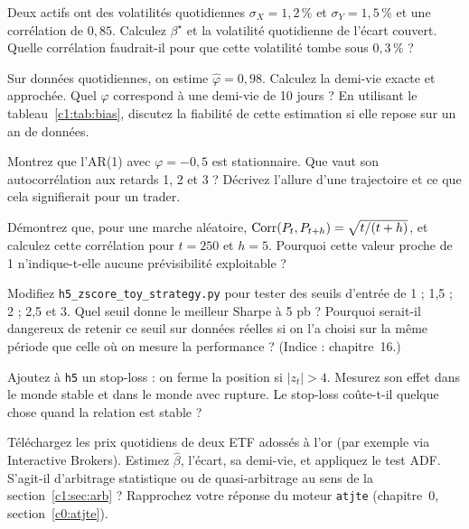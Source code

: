 \begin{exercise}
Deux actifs ont des volatilités quotidiennes $\sigma_X = 1{,}2\,\%$ et $\sigma_Y = 1{,}5\,\%$ et une corrélation de $0{,}85$. Calculez $\beta^\star$ et la volatilité quotidienne de l'écart couvert. Quelle corrélation faudrait-il pour que cette volatilité tombe sous $0{,}3\,\%$ ?
\end{exercise}

\begin{exercise}
Sur données quotidiennes, on estime $\hat\varphi = 0{,}98$. Calculez la demi-vie exacte et approchée. Quel $\varphi$ correspond à une demi-vie de 10 jours ? En utilisant le tableau~\ref{c1:tab:bias}, discutez la fiabilité de cette estimation si elle repose sur un an de données.
\end{exercise}

\begin{exercise}
Montrez que l'AR(1) avec $\varphi = -0{,}5$ est stationnaire. Que vaut son autocorrélation aux retards 1, 2 et 3 ? Décrivez l'allure d'une trajectoire et ce que cela signifierait pour un trader.
\end{exercise}

\begin{exercise}
Démontrez que, pour une marche aléatoire, $\operatorname{Corr}(P_t,P_{t+h}) = \sqrt{t/(t+h)}$, et calculez cette corrélation pour $t = 250$ et $h = 5$. Pourquoi cette valeur proche de 1 n'indique-t-elle aucune prévisibilité exploitable ?
\end{exercise}

\begin{exercise}[à coder]
Modifiez \texttt{h5\_zscore\_toy\_strategy.py} pour tester des seuils d'entrée de 1 ; 1,5 ; 2 ; 2,5 et 3. Quel seuil donne le meilleur Sharpe à 5 pb ? Pourquoi serait-il dangereux de retenir ce seuil sur données réelles si on l'a choisi sur la même période que celle où on mesure la performance ? (Indice : chapitre~16.)
\end{exercise}

\begin{exercise}[à coder]
Ajoutez à \texttt{h5} un stop-loss : on ferme la position si $|z_t| > 4$. Mesurez son effet dans le monde stable et dans le monde avec rupture. Le stop-loss coûte-t-il quelque chose quand la relation est stable ?
\end{exercise}

\begin{exercise}
Téléchargez les prix quotidiens de deux ETF adossés à l'or (par exemple via Interactive Brokers). Estimez $\hat\beta$, l'écart, sa demi-vie, et appliquez le test ADF. S'agit-il d'arbitrage statistique ou de quasi-arbitrage au sens de la section~\ref{c1:sec:arb} ? Rapprochez votre réponse du moteur \texttt{atjte} (chapitre~0, section~\ref{c0:atjte}).
\end{exercise}


